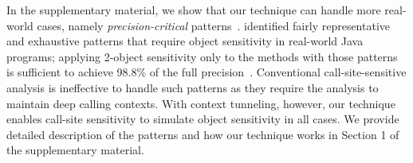 {
In the supplementary material, 
we show that our technique can handle more real-world cases, namely {\em precision-critical} patterns~\cite{Li2018a}. %
\cite{Li2018a} identified fairly representative and
exhaustive patterns that require object sensitivity in real-world Java
programs;
applying 2-object sensitivity only to the methods with those patterns
is sufficient to achieve 98.8\% of the full precision~\cite{Li2018a}. 
Conventional call-site-sensitive analysis is
ineffective to handle such patterns as they require the
analysis to maintain deep calling contexts. With context tunneling,
however, our technique enables call-site
sensitivity to simulate object sensitivity in all cases. We provide
detailed description of the patterns and how our technique works in
Section 1 of the supplementary material. 
}

